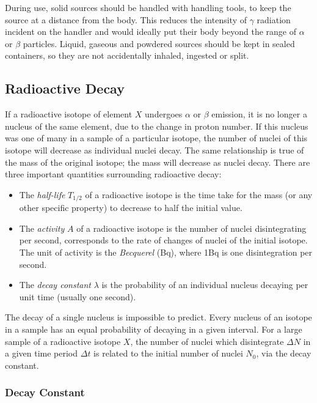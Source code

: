 \documentclass[12pt]{article}
\begin{document}
During use, solid sources should be handled with handling tools, to keep the source at a distance from the body. This reduces the intensity of \(\gamma\) radiation incident on the handler and would ideally put their body beyond the range of \(\alpha\) or \(\beta\) particles. Liquid, gaseous and powdered sources should be kept in sealed containers, so they are not accidentally inhaled, ingested or split.

\subsection{Radioactive Decay}
\label{sec:orgf36de3b}

If a radioactive isotope of element \(X\) undergoes \(\alpha\) or \(\beta\) emission, it is no longer a nucleus of the same element, due to the change in proton number. If this nucleus was one of many in a sample of a particular isotope, the number of nuclei of this isotope will decrease as individual nuclei decay. The same relationship is true of the mass of the original isotope; the mass will decrease as nuclei decay. There are three important quantities surrounding radioactive decay:

\begin{itemize}
\item The \emph{half-life} \(T_{1/2}\) of a radioactive isotope is the time take for the mass (or any other specific property) to decrease to half the initial value.

\item The \emph{activity} \(A\) of a radioactive isotope is the number of nuclei disintegrating per second, corresponds to the rate of changes of nuclei of the initial isotope. The unit of activity is the \emph{Becquerel} (Bq), where 1Bq is one disintegration per second.

\item The \emph{decay constant} \(\lambda\) is the probability of an individual nucleus decaying per unit time (usually one second).
\end{itemize}

The decay of a single nucleus is impossible to predict. Every nucleus of an isotope in a sample has an equal probability of decaying in a given interval. For a large sample of a radioactive isotope \(X\), the number of nuclei which disintegrate \(\Delta N\) in a given time period \(\Delta t\) is related to the initial number of nuclei \(N_0\), via the decay constant.

\subsubsection{Decay Constant}
\label{sec:org5e7cd5e}
\end{document}
